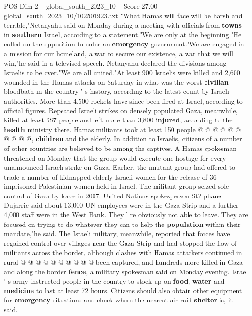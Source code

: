 \begin{textsample}{POS Dim 2 – global\_south\_2023\_10 – Score 27.00 – global\_south\_2023\_10/102501923.txt}  \label{ex:f2_pos_180}
"What Hamas will face will be harsh and terrible,"Netanyahu said on Monday during a meeting with officials from \textbf{towns} in \textbf{southern} Israel, according to a statement."We are only at the beginning."He called on the opposition to enter an \textbf{emergency} government."We are engaged in a mission for our homeland, a war to secure our existence, a war that we will win,"he said in a televised speech.
Netanyahu declared the divisions among Israelis to be over."We are all united."At least 900 Israelis were killed and 2,600 wounded in the Hamas attacks on Saturday in what was the worst \textbf{civilian} bloodbath in the country ' s history, according to the latest count by Israeli authorities.
More than 4,500 rockets have since been fired at Israel, according to official figures.
Repeated Israeli strikes on densely populated Gaza, meanwhile, killed at least 687 people and left more than 3,800 \textbf{injured}, according to the \textbf{health} ministry there.
Hamas militants took at least 150 people @ @ @ @ @ @ @ @ @ @, \textbf{children} and the elderly.
In addition to Israelis, citizens of a number of other countries are believed to be among the captives.
A Hamas spokesman threatened on Monday that the group would execute one hostage for every unannounced Israeli strike on Gaza.
Earlier, the militant group had offered to trade a number of kidnapped elderly Israeli women for the release of 36 imprisoned Palestinian women held in Israel.
The militant group seized sole control of Gaza by force in 2007.
United Nations spokesperson St? phane Dujarric said about 13,000 UN employees were in the Gaza Strip and a further 4,000 staff were in the West Bank.
They ' re obviously not able to leave.
They are focused on trying to do whatever they can to help the \textbf{population} within their mandate,"he said.
The Israeli military, meanwhile, reported that forces have regained control over villages near the Gaza Strip and had stopped the flow of militants across the border, although clashes with Hamas attackers continued in rural @ @ @ @ @ @ @ @ @ @ been captured, and hundreds more killed in Gaza and along the border \textbf{fence}, a military spokesman said on Monday evening.
Israel ' s army instructed people in the country to stock up on \textbf{food}, \textbf{water} and \textbf{medicine} to last at least 72 hours.
Citizens should also obtain other equipment for \textbf{emergency} situations and check where the nearest air raid \textbf{shelter} is, it said.

\end{textsample}
